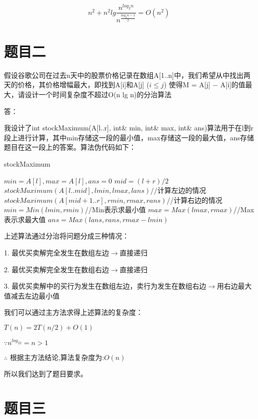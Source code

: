 \documentclass[UTF8]{ctexart}
\begin{document}
$$
n^2 +  n^2lg\frac{n^{log_2n}}{n^{\frac{log_2n - 1}{2}}} = O(n^2)
$$



\quad 

\section{题目二}

假设谷歌公司在过去n天中的股票价格记录在数组A[1..n]中，我们希望从中找出两天的价格，其价格增幅最大，即找到A[i]和A[j] ($i \le j$) 使得M = A[j] − A[i]的值最大，请设计一个时间复杂度不超过O(n lg n)的分治算法

\noindent 答：

我设计了int stockMaximum(A[l..r], int\& min, int\& max, int\& ans)算法用于在l到r段上进行计算，其中min存储这一段的最小值，max存储这一段的最大值，ans存储题目在这一段上的答案。算法伪代码如下：

\begin{algorithm}[h]
  \caption{stockMaximum}
  \begin{algorithmic}[1]
  \STATE $min = A[l], max = A[l], ans = 0$
  \ELSE
  \STATE $mid = (l + r) / 2$
  \STATE $stockMaximum(A[l..mid], lmin, lmax, lans)$//计算左边的情况
  \STATE $stockMaximum(A[mid + 1..r], rmin, rmax, rans)$//计算右边的情况
  \STATE $min = Min(lmin, rmin)$//Min表示求最小值
  \STATE $max = Max(lmax, rmax)$//Max表示求最大值
  \STATE $ans = Max(lans, rans, rmax - lmin)$
  \ENDIF
  \end{algorithmic}
\end{algorithm}

上述算法通过分治将问题分成三种情况：

1. 最优买卖解完全发生在数组左边$\rightarrow$直接递归

2. 最优买卖解完全发生在数组右边$\rightarrow$直接递归

3. 最优买卖解中的买行为发生在数组左边，卖行为发生在数组右边$\rightarrow$用右边最大值减去左边最小值

我们可以通过主方法求得上述算法的复杂度：

$T(n) = 2T(n/2) + O(1)$

$\because n^{log_22} = n > 1$

$\therefore$ 根据主方法结论,算法复杂度为:$O(n)$

所以我们达到了题目要求。

\section{题目三}
\end{document}
